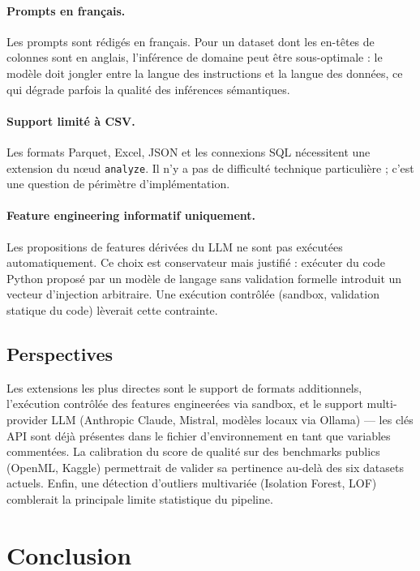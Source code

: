 \documentclass[12pt,a4paper]{article}
\begin{document}
\paragraph{Prompts en français.}
Les prompts sont rédigés en français. Pour un dataset dont les en-têtes de colonnes sont
en anglais, l'inférence de domaine peut être sous-optimale : le modèle doit jongler entre
la langue des instructions et la langue des données, ce qui dégrade parfois la qualité
des inférences sémantiques.

\paragraph{Support limité à CSV.}
Les formats Parquet, Excel, JSON et les connexions SQL nécessitent une extension du
nœud \texttt{analyze}. Il n'y a pas de difficulté technique particulière ; c'est une
question de périmètre d'implémentation.

\paragraph{Feature engineering informatif uniquement.}
Les propositions de features dérivées du LLM ne sont pas exécutées automatiquement.
Ce choix est conservateur mais justifié : exécuter du code Python proposé par un modèle
de langage sans validation formelle introduit un vecteur d'injection arbitraire.
Une exécution contrôlée (sandbox, validation statique du code) lèverait cette
contrainte.

\subsection{Perspectives}

Les extensions les plus directes sont le support de formats additionnels, l'exécution
contrôlée des features engineerées via sandbox, et le support multi-provider LLM
(Anthropic Claude, Mistral, modèles locaux via Ollama) --- les clés API sont déjà
présentes dans le fichier d'environnement en tant que variables commentées. La
calibration du score de qualité sur des benchmarks publics (OpenML, Kaggle) permettrait
de valider sa pertinence au-delà des six datasets actuels. Enfin, une détection
d'outliers multivariée (Isolation Forest, LOF) comblerait la principale limite
statistique du pipeline.

\section{Conclusion}
\end{document}
